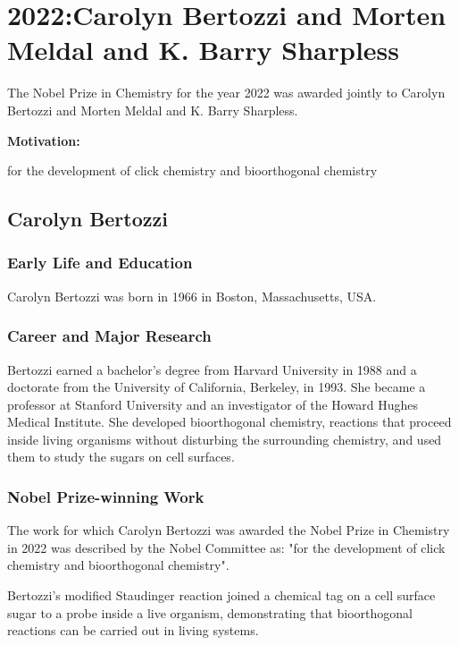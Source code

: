 \chapter{2022:Carolyn Bertozzi and Morten Meldal and K. Barry Sharpless}

\label{chap:chemistry2022}

The Nobel Prize in Chemistry for the year 2022 was awarded jointly to Carolyn Bertozzi and Morten Meldal and K. Barry Sharpless.

\textbf{Motivation:}

for the development of click chemistry and bioorthogonal chemistry

\section{Carolyn Bertozzi}

\subsection*{Early Life and Education}

Carolyn Bertozzi was born in 1966 in Boston, Massachusetts, USA.

\subsection*{Career and Major Research}

Bertozzi earned a bachelor's degree from Harvard University in 1988 and a doctorate from the University of California, Berkeley, in 1993. She became a professor at Stanford University and an investigator of the Howard Hughes Medical Institute. She developed bioorthogonal chemistry, reactions that proceed inside living organisms without disturbing the surrounding chemistry, and used them to study the sugars on cell surfaces.

\subsection*{Nobel Prize-winning Work}

The work for which Carolyn Bertozzi was awarded the Nobel Prize in Chemistry in 2022 was described by the Nobel Committee as: "for the development of click chemistry and bioorthogonal chemistry".

Bertozzi's modified Staudinger reaction joined a chemical tag on a cell surface sugar to a probe inside a live organism, demonstrating that bioorthogonal reactions can be carried out in living systems.

